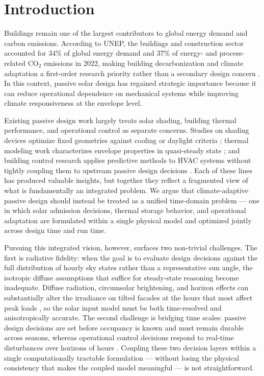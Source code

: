 \documentclass[5p,times,twocolumn]{elsarticle}
\begin{document}

\section{Introduction}
\label{sec:introduction}

Buildings remain one of the largest contributors to global energy demand and carbon emissions. According to UNEP, the buildings and construction sector accounted for 34\% of global energy demand and 37\% of energy- and process-related CO$_2$ emissions in 2022, making building decarbonization and climate adaptation a first-order research priority rather than a secondary design concern \cite{unep2024}. In this context, passive solar design has regained strategic importance because it can reduce operational dependence on mechanical systems while improving climate responsiveness at the envelope level.

Existing passive design work largely treats solar shading, building thermal performance, and operational control as separate concerns. Studies on shading devices optimize fixed geometries against cooling or daylight criteria \cite{kirimtat2016,valladares2014,nazari2023}; thermal modeling work characterizes envelope properties in quasi-steady state \cite{verbeke2018,yang2024,lauster2014}; and building control research applies predictive methods to HVAC systems without tightly coupling them to upstream passive design decisions \cite{drgona2020,zhan2021}. Each of these lines has produced valuable insights, but together they reflect a fragmented view of what is fundamentally an integrated problem. We argue that climate-adaptive passive design should instead be treated as a unified time-domain problem --- one in which solar admission decisions, thermal storage behavior, and operational adaptation are formulated within a single physical model and optimized jointly across design time and run time.

Pursuing this integrated vision, however, surfaces two non-trivial challenges. The first is radiative fidelity: when the goal is to evaluate design decisions against the full distribution of hourly sky states rather than a representative sun angle, the isotropic diffuse assumptions that suffice for steady-state reasoning become inadequate. Diffuse radiation, circumsolar brightening, and horizon effects can substantially alter the irradiance on tilted facades at the hours that most affect peak loads \cite{perez1990}, so the solar input model must be both time-resolved and anisotropically accurate. The second challenge is bridging time scales: passive design decisions are set before occupancy is known and must remain durable across seasons, whereas operational control decisions respond to real-time disturbances over horizons of hours \cite{goncalves2024,hong2023,ismail2023}. Coupling these two decision layers within a single computationally tractable formulation --- without losing the physical consistency that makes the coupled model meaningful --- is not straightforward.
\end{document}
